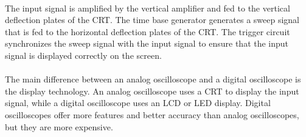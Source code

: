 \documentclass[11pt]{article}
\begin{document}
\begin{question}
{        \paragraph*{}
        The input signal is amplified by the vertical amplifier and fed to the vertical deflection plates of the CRT.
        The time base generator generates a sweep signal that is fed to the horizontal deflection plates of the CRT.
        The trigger circuit synchronizes the sweep signal with the input signal to ensure that the input signal is displayed correctly on the screen.

        \paragraph*{}
        The main difference between an analog oscilloscope and a digital oscilloscope is the display technology.
        An analog oscilloscope uses a CRT to display the input signal, while a digital oscilloscope uses an LCD or LED display.
        Digital oscilloscopes offer more features and better accuracy than analog oscilloscopes, but they are more expensive.

    }

\end{question}

\end{document}
